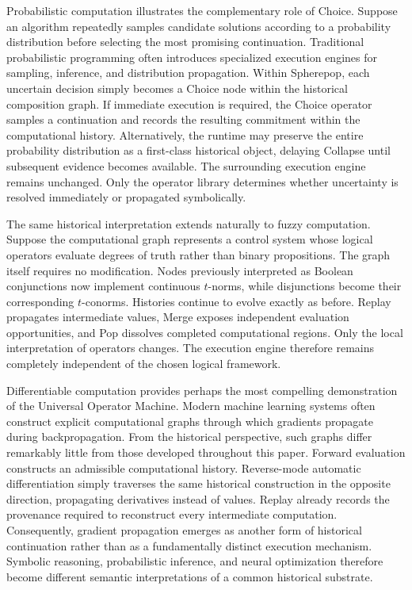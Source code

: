 \documentclass[12pt,oneside]{article}
\theoremstyle{definition}
\theoremstyle{remark}
\begin{document}
Probabilistic computation illustrates the complementary role of Choice.
Suppose an algorithm repeatedly samples candidate solutions according to a
probability distribution before selecting the most promising continuation.
Traditional probabilistic programming often introduces specialized execution
engines for sampling, inference, and distribution propagation. Within
Spherepop, each uncertain decision simply becomes a Choice node within the
historical composition graph. If immediate execution is required, the Choice
operator samples a continuation and records the resulting commitment within
the computational history. Alternatively, the runtime may preserve the entire
probability distribution as a first-class historical object, delaying Collapse
until subsequent evidence becomes available. The surrounding execution engine
remains unchanged. Only the operator library determines whether uncertainty is
resolved immediately or propagated symbolically.

The same historical interpretation extends naturally to fuzzy computation.
Suppose the computational graph represents a control system whose logical
operators evaluate degrees of truth rather than binary propositions. The graph
itself requires no modification. Nodes previously interpreted as Boolean
conjunctions now implement continuous \(t\)-norms, while disjunctions become
their corresponding \(t\)-conorms. Histories continue to evolve exactly as
before. Replay propagates intermediate values, Merge exposes independent
evaluation opportunities, and Pop dissolves completed computational regions.
Only the local interpretation of operators changes. The execution engine
therefore remains completely independent of the chosen logical framework.

Differentiable computation provides perhaps the most compelling demonstration
of the Universal Operator Machine. Modern machine learning systems often
construct explicit computational graphs through which gradients propagate
during backpropagation. From the historical perspective, such graphs differ
remarkably little from those developed throughout this paper. Forward
evaluation constructs an admissible computational history. Reverse-mode
automatic differentiation simply traverses the same historical construction in
the opposite direction, propagating derivatives instead of values. Replay
already records the provenance required to reconstruct every intermediate
computation. Consequently, gradient propagation emerges as another form of
historical continuation rather than as a fundamentally distinct execution
mechanism. Symbolic reasoning, probabilistic inference, and neural
optimization therefore become different semantic interpretations of a common
historical substrate.
\end{document}
